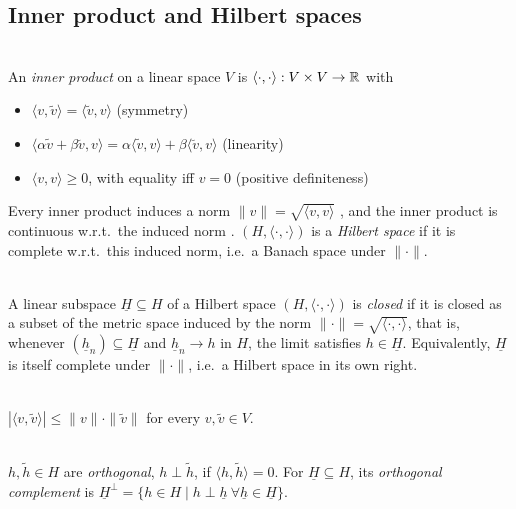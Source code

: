 \subsection{Inner product and Hilbert spaces}
\begin{definition} \label{chap0:definition-hilbert_space}  \\
An \textit{inner product} on a linear space $V$ is $\langle\cdot,\cdot\rangle:V\times V\to\mathbb{R}$ with
\begin{itemize}
    \item $\langle v,\tilde v\rangle=\langle\tilde v,v\rangle$ (symmetry)
    \item $\langle\alpha\tilde v+\beta\breve v,v\rangle=\alpha\langle\tilde v,v\rangle+\beta\langle\breve v,v\rangle$ (linearity)
    \item $\langle v,v\rangle\ge0$, with equality iff $v=0$ (positive definiteness)
\end{itemize}
Every inner product induces a norm $\|v\|=\sqrt{\langle v,v\rangle}$ , and the inner product is continuous w.r.t.\ the induced norm . $(H,\langle\cdot,\cdot\rangle)$ is a \textit{Hilbert space} if it is complete w.r.t.\ this induced norm, i.e.\ a Banach space under $\|\cdot\|$.
\end{definition}

\begin{definition} \label{chap0:definition-closed_subspace}  \\
A linear subspace $\underline H\subseteq H$ of a Hilbert space $(H,\langle\cdot,\cdot\rangle)$ is \textit{closed} if it is closed as a subset of the metric space induced by the norm $\|\cdot\|=\sqrt{\langle\cdot,\cdot\rangle}$, that is, whenever $(\underline h_n)\subseteq\underline H$ and $\underline h_n\to h$ in $H$, the limit satisfies $h\in\underline H$. Equivalently, $\underline H$ is itself complete under $\|\cdot\|$, i.e.\ a Hilbert space in its own right.
\end{definition}

\begin{proposition}  \\
$|\langle v,\tilde v\rangle|\le\|v\|\cdot\|\tilde v\|$ for every $v,\tilde v\in V$.
\end{proposition}

\begin{definition}  \\
$h,\tilde h\in H$ are \textit{orthogonal}, $h\perp\tilde h$, if $\langle h,\tilde h\rangle=0$. For $\underline H\subseteq H$, its \textit{orthogonal complement} is $\underline H^\perp=\{h\in H\mid h\perp\underline h\ \forall\underline h\in\underline H\}$.
\end{definition}

